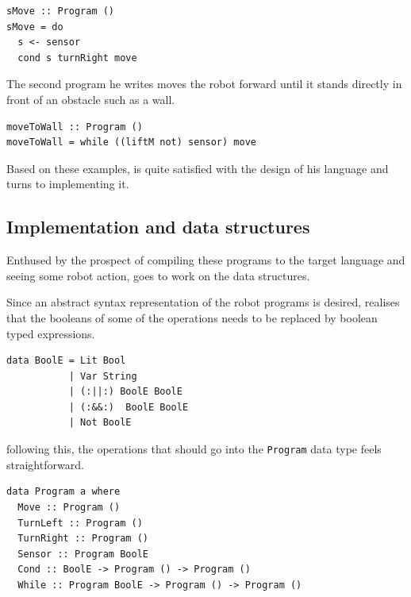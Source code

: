 \begin{small} 
\begin{verbatim}
sMove :: Program () 
sMove = do 
  s <- sensor 
  cond s turnRight move 
\end{verbatim}
\end{small}  

The second program he writes moves the robot forward until it stands directly 
in front of an obstacle such as a wall. 

\begin{small} 
\begin{verbatim}
moveToWall :: Program () 
moveToWall = while ((liftM not) sensor) move
\end{verbatim}
\end{small}  

Based on these examples, \studname{} is quite satisfied with the design of his
language and turns to implementing it.

\subsection{Implementation and data structures} 

Enthused by the prospect of compiling these programs to the target language and 
seeing some robot action, \studname{} goes to work on the data structures. 

Since an abstract syntax representation of the robot programs is desired, \studname{} 
realises that the booleans of some of the operations needs to be replaced by 
boolean typed expressions. 

\begin{small} 
\begin{verbatim}
data BoolE = Lit Bool
           | Var String
           | (:||:) BoolE BoolE
           | (:&&:)  BoolE BoolE
           | Not BoolE  
\end{verbatim} 
\end{small}  

following this, the  operations that should go into the {\tt Program} data type 
feels straightforward.

\begin{small} 
\begin{verbatim}
data Program a where 
  Move :: Program () 
  TurnLeft :: Program () 
  TurnRight :: Program () 
  Sensor :: Program BoolE
  Cond :: BoolE -> Program () -> Program () 
  While :: Program BoolE -> Program () -> Program () 
\end{verbatim} 
\end{small} 

